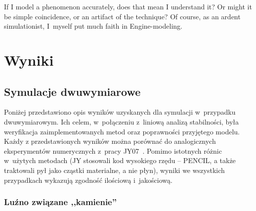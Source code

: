 \begin{savequote}[75mm]
   If I model a phenomenon accurately, does that mean I understand it? Or might it be simple coincidence, or an artifact
   of the technique? Of course, as an ardent simulationist, I~myself put much faith in Engine-modeling.
\end{savequote}

\chapter{Wyniki}



\section{Symulacje dwuwymiarowe}
\label{sec:sim_2d}
Poniżej przedstawiono opis wyników uzyskanych dla symulacji w~przypadku
dwuwymiarowym. Ich celem, w~połączeniu z~liniową analizą stabilności, była
weryfikacja zaimplementowanych metod oraz poprawności przyjętego modelu. Każdy z
przedstawionych wyników można porównać do analogicznych eksperymentów
numerycznych z~pracy JY07~\cite{JY07}. Pomimo istotnych różnic w~użytych
metodach (JY stosowali kod wysokiego rzędu -- PENCIL, a także traktowali pył
jako cząstki materialne, a nie płyn), wyniki we wszystkich przypadkach wykazują
zgodność ilościową i~jakościową.

\subsection{Luźno związane ,,kamienie''}%

